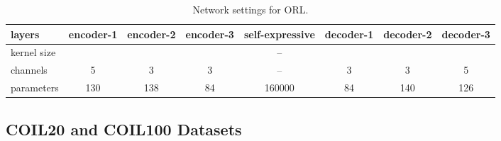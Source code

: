 \documentclass{article}
\begin{document}
\begin{table}[!t]
\centering
\footnotesize
\hspace*{-0.1cm}\begin{tabular}{ | l | c  c  c  c  c  c c | }
\hline
  layers      & encoder-1   & encoder-2  &  encoder-3 & self-expressive & decoder-1  & decoder-2   & decoder-3 \\            
  \hline
kernel size  &  &  &  & -- &   &    &   \\  
channels&  5         &  3         &   3        & -- & 3           &  3           & 5 \\
parameters& 130     & 138   & 84   & 160000  & 84  & 140 & 126 \\
\hline
\end{tabular}
\caption{Network settings for ORL.}
\label{tab:struct-orl}
\vspace{-0.7cm}
\end{table}




\subsection{COIL20 and COIL100 Datasets}
\end{document}
